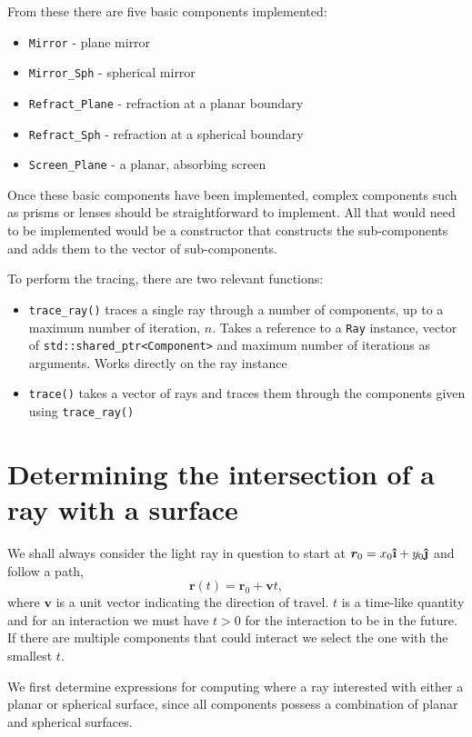 \documentclass{article}
\let\vec \bm
\newcommand{\uveci}{{\bm{\hat{\textnormal{\bfseries\i}}}}}
\newcommand{\uvecj}{{\bm{\hat{\textnormal{\bfseries\j}}}}}
\begin{document}
From these there are five basic components implemented:
\begin{itemize}
    \item \texttt{Mirror} - plane mirror
    \item \texttt{Mirror\_Sph} - spherical mirror
    \item \texttt{Refract\_Plane} - refraction at a planar boundary
    \item \texttt{Refract\_Sph} - refraction at a spherical boundary
    \item \texttt{Screen\_Plane} - a planar, absorbing screen
\end{itemize}

Once these basic components have been implemented, complex components such as prisms or lenses should be straightforward to implement. All that would need to be implemented would be a constructor that constructs the sub-components and adds them to the vector of sub-components.

To perform the tracing, there are two relevant functions:
\begin{itemize}
    \item \texttt{trace\_ray()} traces a single ray through a number of components, up to a maximum number of iteration, $n$. Takes a reference to a \texttt{Ray} instance, vector of \texttt{std::shared\_ptr<Component>} and maximum number of iterations as arguments. Works directly on the ray instance
    \item \texttt{trace()} takes a vector of rays and traces them through the components given using \texttt{trace\_ray()}
\end{itemize}

\section{Determining the intersection of a ray with a surface}
We shall always consider the light ray in question to start at $\vec{r}_0 = x_0 \uveci + y_0 \uvecj$ and follow a path,
\begin{equation}
    \vec{r}(t) = \vec{r}_0 + \vec{v}t,
\end{equation}
where $\vec{v}$ is a unit vector indicating the direction of travel. $t$ is a time-like quantity and for an interaction we must have $t > 0$ for the interaction to be in the future. If there are multiple components that could interact we select the one with the smallest $t$.

We first determine expressions for computing where a ray interested with either a planar or spherical surface, since all components possess a combination of planar and spherical surfaces.
\end{document}
